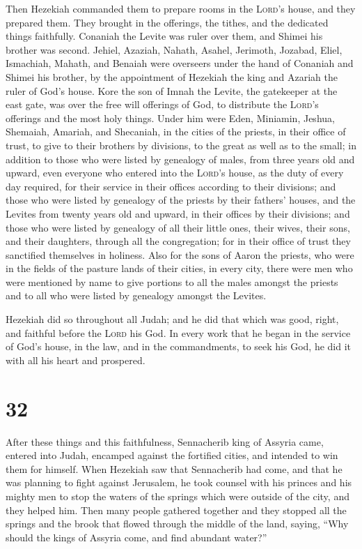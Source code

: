  Then Hezekiah commanded them to prepare rooms in the
\textsc{Lord}'s house, and they prepared them.  They
brought in the offerings, the tithes, and the dedicated things
faithfully. Conaniah the Levite was ruler over them, and Shimei his
brother was second.  Jehiel, Azaziah, Nahath, Asahel,
Jerimoth, Jozabad, Eliel, Ismachiah, Mahath, and Benaiah were overseers
under the hand of Conaniah and Shimei his brother, by the appointment of
Hezekiah the king and Azariah the ruler of God's house. 
Kore the son of Imnah the Levite, the gatekeeper at the east gate, was
over the free will offerings of God, to distribute the \textsc{Lord}'s
offerings and the most holy things.  Under him were Eden,
Miniamin, Jeshua, Shemaiah, Amariah, and Shecaniah, in the cities of the
priests, in their office of trust, to give to their brothers by
divisions, to the great as well as to the small;  in
addition to those who were listed by genealogy of males, from three
years old and upward, even everyone who entered into the \textsc{Lord}'s
house, as the duty of every day required, for their service in their
offices according to their divisions;  and those who were
listed by genealogy of the priests by their fathers' houses, and the
Levites from twenty years old and upward, in their offices by their
divisions;  and those who were listed by genealogy of all
their little ones, their wives, their sons, and their daughters, through
all the congregation; for in their office of trust they sanctified
themselves in holiness.  Also for the sons of Aaron the
priests, who were in the fields of the pasture lands of their cities, in
every city, there were men who were mentioned by name to give portions
to all the males amongst the priests and to all who were listed by
genealogy amongst the Levites.

 Hezekiah did so throughout all Judah; and he did that
which was good, right, and faithful before the \textsc{Lord} his God.
 In every work that he began in the service of God's
house, in the law, and in the commandments, to seek his God, he did it
with all his heart and prospered.

\hypertarget{section-31}{%
\section{32}\label{section-31}}

 After these things and this faithfulness, Sennacherib
king of Assyria came, entered into Judah, encamped against the fortified
cities, and intended to win them for himself.  When
Hezekiah saw that Sennacherib had come, and that he was planning to
fight against Jerusalem,  he took counsel with his princes
and his mighty men to stop the waters of the springs which were outside
of the city, and they helped him.  Then many people
gathered together and they stopped all the springs and the brook that
flowed through the middle of the land, saying, ``Why should the kings of
Assyria come, and find abundant water?''

